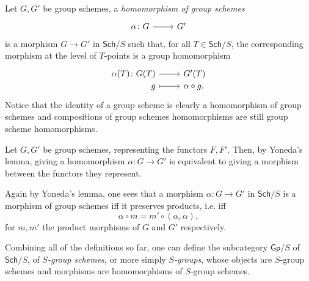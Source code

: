 \begin{defn}
	Let $G, G'$ be group schemes, a \emph{homomorphism of group schemes}
	\begin{equation*}
		\begin{tikzcd}
			\alpha\colon G \arrow[r, "", rightarrow] &
			G'
		\end{tikzcd}
	\end{equation*} 
	is a morphism $G \to G'$ in $\mathsf{Sch}/S$ such that, for all
	$T \in \mathsf{Sch}/S$, the corresponding morphism at the level of $T$-points
	is a group homomorphism
	\begin{equation*}
	\begin{tikzcd}[row sep = 0ex
		,/tikz/column 1/.append style={anchor=base east}
		,/tikz/column 2/.append style={anchor=base west}]
		\alpha(T)\colon G(T) \arrow[r, "", rightarrow] &
		G'(T) \\
		g \arrow[r, "", mapsto] & \alpha \circ g.
	\end{tikzcd}
	\end{equation*} 
	Notice that the identity of a group scheme is clearly a homomorphism of group
	schemes and compositions of group schemes homomorphisms are still
	group scheme homomorphisms.
\end{defn}


\begin{rem}
	Let $G, G'$ be group schemes, representing the functors $F,F'$.
	Then, by Yoneda's lemma, giving a homomorphism $\alpha\colon G \to G'$
	is equivalent to giving a morphism between the functors they represent.

	Again by Yoneda's lemma, one sees that a morphism $\alpha\colon G \to G'$
	in $\mathsf{Sch}/S$ is a morphism of group schemes iff
	it preserves products, i.e. iff
	\begin{equation*}
		\alpha \circ m = m' \circ (\alpha, \alpha)
	,\end{equation*} 
	for $m, m'$ the product morphisms of $G$ and $G'$ respectively.
\end{rem}


\begin{defn}\label{defn:CatOfGroupSchemes}
	Combining all of the definitions so far, 
	one can define the subcategory $\mathsf{Gp}/S$ of $\mathsf{Sch}/S$,
	of \emph{$S$-group schemes}, or more simply \emph{$S$-groups},
	whose objects are $S$-group schemes
	and morphisms are homomorphisms of $S$-group schemes.
\end{defn}


